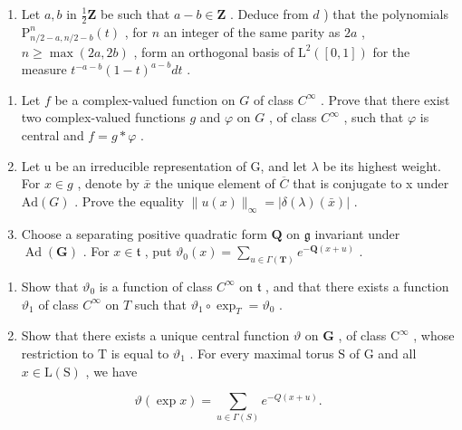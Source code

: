 \begin{enumerate}
\begin{enumerate}
\def\labelenumi{\alph{enumi})}
\setcounter{enumi}{4}
\tightlist
\item
  Let \(a, b\) in \(\frac{1}{2}\mathbf{Z}\) be such that \(a - b \in \mathbf{Z}\) . Deduce from \(d\) ) that the polynomials \(\mathrm{P}_{n/2 - a, n/2 - b}^n(t)\) , for \(n\) an integer of the same parity as \(2a\) , \(n \geq \max(2a, 2b)\) , form an orthogonal basis of \(\mathrm{L}^2([0,1])\) for the measure \(t^{-a - b}(1 - t)^{a - b}dt\) .
\end{enumerate}

\begin{enumerate}
\def\labelenumi{\arabic{enumi})}
\setcounter{enumi}{1}
\item
  Let \(f\) be a complex-valued function on \(G\) of class \(C^\infty\) . Prove that there exist two complex-valued functions \(g\) and \(\varphi\) on \(G\) , of class \(C^\infty\) , such that \(\varphi\) is central and \(f = g * \varphi\) .
\item
  Let u be an irreducible representation of G, and let \(\lambda\) be its highest weight. For \(x \in g\) , denote by \(\bar{x}\) the unique element of \(\overline{C}\) that is conjugate to x under \(\mathrm{Ad}(G)\) . Prove the equality \(\|u(x)\|_{\infty} = |\delta(\lambda)(\bar{x})|\) .
\item
  Choose a separating positive quadratic form \(\mathbf{Q}\) on \(\mathfrak{g}\) invariant under \(\operatorname{Ad}(\mathbf{G})\) . For \(x \in \mathfrak{t}\) , put \(\vartheta_0(x) = \sum_{u \in \Gamma(\mathbf{T})} e^{-\mathbf{Q}(x + u)}\) .
\end{enumerate}

\begin{enumerate}
\def\labelenumi{\alph{enumi})}
\item
  Show that \(\vartheta_0\) is a function of class \(C^\infty\) on \(\mathfrak{t}\) , and that there exists a function \(\vartheta_1\) of class \(C^\infty\) on \(T\) such that \(\vartheta_1 \circ \exp_T = \vartheta_0\) .
\item
  Show that there exists a unique central function \(\vartheta\) on \(\mathbf{G}\) , of class \(\mathrm{C}^{\infty}\) , whose restriction to \(\mathrm{T}\) is equal to \(\vartheta_{1}\) . For every maximal torus \(\mathrm{S}\) of \(\mathrm{G}\) and all \(x\in \mathrm{L}(\mathrm{S})\) , we have
\end{enumerate}

\[
\vartheta (\exp x) = \sum_ {u \in \Gamma (S)} e ^ {- Q (x + u)}.
\]


\end{enumerate}
